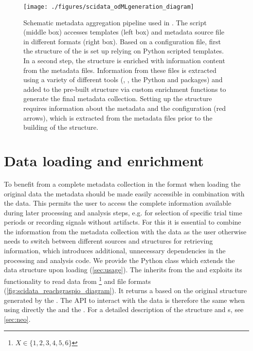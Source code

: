 \begin{figure}
 \texttt{[image: ./figures/scidata\_odMLgeneration\_diagram]}
 \caption[Schematic metadata aggregation pipeline used in \citet{Brochier_2018}]{Schematic metadata aggregation pipeline used in \citet{Brochier_2018}. The  script (middle box) accesses  templates (left box) and metadata source file in different formats (right box). Based on a configuration file, first the structure of the  is set up relying on Python scripted  templates. In a second step, the structure is enriched with information content from the metadata files. Information from these files is extracted using a variety of different tools (, , the Python  and  packages) and added to the pre-built  structure via custom enrichment functions to generate the final metadata collection. Setting up the  structure requires information about the metadata and the configuration (red arrows), which is extracted from the metadata files prior to the building of the  structure.}
 \label{fig:scidata_metadata_pipeline}
\end{figure}

\section{Data loading and enrichment}
\label{sec:data_loading_and_enrichment}
To benefit from a complete metadata collection in the  format when loading the original data the metadata should be made easily accessible in combination with the data. This permits the user to access the complete information available during later processing and analysis steps, e.g. for selection of specific trial time periods or recording signals without artifacts. For this it is essential to combine the information from the metadata collection with the data as the user otherwise needs to switch between different sources and structures for retrieving information, which introduces additional, unnecessary dependencies in the processing and analysis code.
We provide the  Python class which extends the  data structure upon loading (\cref{sec:usage}). The  inherits from the   and exploits its functionality to read data from \footnote{$X \in \{1,2,3,4,5,6\}$} and  file formats (\cref{fig:scidata_reachgraspio_diagram}). It returns a   based on the original structure generated by the  . The API to interact with the data is therefore the same when using directly the   and the . For a detailed description of the  structure and s, see \cref{sec:neo}.

